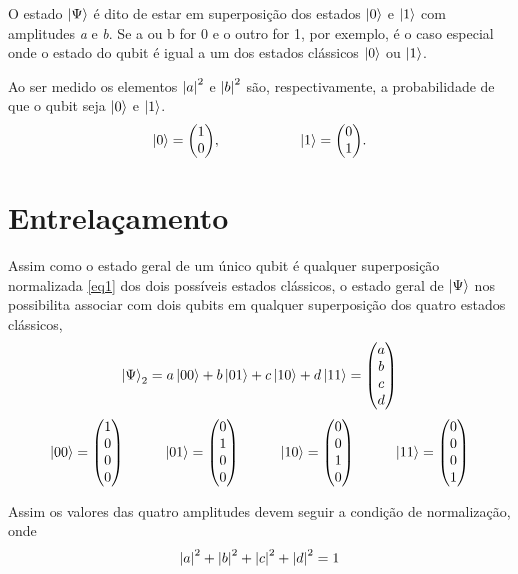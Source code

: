 \documentclass[a4paper, 12pt, oneside]{book}
\begin{document}
O estado $\ket{\Psi}$ é dito de estar em superposição dos estados $\ket{0}$ e $\ket{1}$ com amplitudes \textit{a} e \textit{b}. Se a ou b for 0 e o outro for 1, por exemplo, é o caso especial onde o estado do qubit é igual a um dos estados clássicos $\ket{0}$ ou $\ket{1}$.

Ao ser medido os elementos $\abs{a}^2$ e $\abs{b}^2$ são, respectivamente, a probabilidade de que o qubit seja $\ket{0}$ e $\ket{1}$. 
\begin{align*} 
  \ket{0} = \mqty(1\\0) ,\hspace{2cm} 
  \ket{1} = \mqty(0\\1).
\end{align*}


\section{Entrelaçamento}
Assim como o estado geral de um único qubit é qualquer superposição normalizada \eqref{eq1} dos dois possíveis estados clássicos, o estado geral de $\ket{\Psi}$ nos possibilita associar com dois qubits em qualquer superposição dos quatro estados clássicos,
\begin{equation}\label{eq3}
\ket{\Psi}_2 = a\ket{00} + b\ket{01} + c\ket{10} + d\ket{11} = \mqty(a\\b\\c\\d)
\end{equation}
\begin{align*}
  \ket{00} = \mqty(1\\0\\0\\0) \hspace{1cm} 
  \ket{01} = \mqty(0\\1\\0\\0) \hspace{1cm} 
  \ket{10} = \mqty(0\\0\\1\\0) \hspace{1cm} 
  \ket{11} = \mqty(0\\0\\0\\1)
\end{align*}

Assim os valores das quatro amplitudes devem seguir a condição de normalização, onde
\begin{equation}\label{eq4}
\abs{a}^2 + \abs{b}^2 + \abs{c}^2 + \abs{d}^2 = 1
\end{equation}
\end{document}
